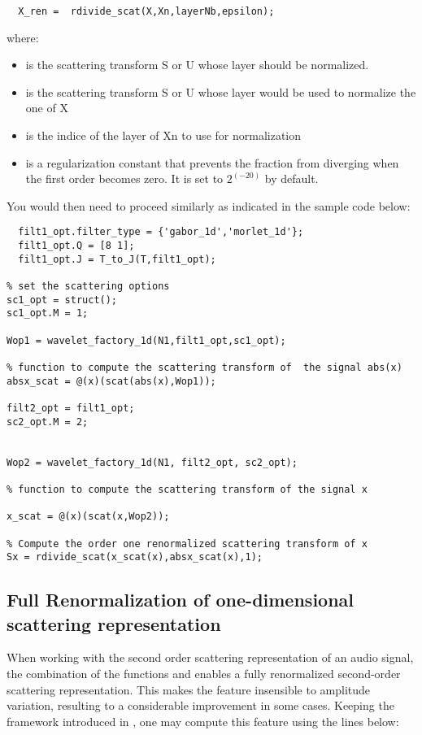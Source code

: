 \documentclass{article}
\begin{document}
\begin{lstlisting}
  X_ren =  rdivide_scat(X,Xn,layerNb,epsilon);
\end{lstlisting}

where:

\begin{itemize}

    \item {} is the scattering transform S or U whose layer should be normalized.
	\item {} is the scattering transform S or U whose layer would be used to normalize the one of X
	\item {} is the indice of the layer of Xn to use for normalization
    \item {}  is a regularization constant that prevents the fraction from diverging when the first order becomes zero. It is set to $2^(-20)$ by default.

\end{itemize}

You would then need to proceed similarly as indicated in the sample code below:

\begin{lstlisting}
  filt1_opt.filter_type = {'gabor_1d','morlet_1d'};
  filt1_opt.Q = [8 1];
  filt1_opt.J = T_to_J(T,filt1_opt);

% set the scattering options
sc1_opt = struct();
sc1_opt.M = 1;

Wop1 = wavelet_factory_1d(N1,filt1_opt,sc1_opt);

% function to compute the scattering transform of  the signal abs(x)
absx_scat = @(x)(scat(abs(x),Wop1));

filt2_opt = filt1_opt;
sc2_opt.M = 2;


Wop2 = wavelet_factory_1d(N1, filt2_opt, sc2_opt);

% function to compute the scattering transform of the signal x

x_scat = @(x)(scat(x,Wop2));

% Compute the order one renormalized scattering transform of x
Sx = rdivide_scat(x_scat(x),absx_scat(x),1);

\end{lstlisting}


\subsection{Full Renormalization of one-dimensional scattering representation}
When working with the second order scattering representation of an audio signal, the combination of the functions  and  enables a fully renormalized second-order scattering representation. This makes the feature insensible to amplitude variation, resulting to a considerable improvement in some cases. Keeping the framework introduced in , one may compute this feature using the lines below:
\end{document}
